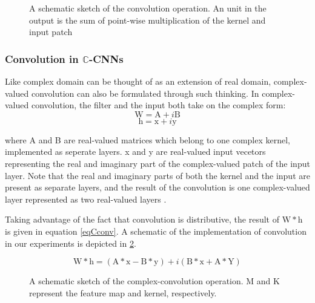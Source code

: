 \begin{figure}[htb]
	\centering
	\epsfxsize=6cm
	{}
	\caption{A schematic sketch of the convolution operation. An unit in the output is the sum of point-wise multiplication of the kernel and input patch \cite{bloggg}}
	\label{fig:conv}
\end{figure}
 

\subsubsection{Convolution in $\mathbb{C}$-CNNs}
Like complex domain can be thought of as an extension of real domain, complex-valued convolution can also be formulated through such thinking. In complex-valued convolution, the filter and the input both take on the complex form:
 \begin{equation}
\mathrm{W} = \mathrm{A}+i\mathrm{B}
\label{eqCfilter}
\end{equation}
 \begin{equation}
\mathrm{h} = \mathrm{x}+i\mathrm{y}
\label{eqCinput}
\end{equation}
 
where A and B are real-valued matrices which belong to one complex kernel, implemented as seperate layers. x and y are real-valued input vecetors  representing the real and imaginary part of the complex-valued patch of the input layer. Note that the real and imaginary parts of both the kernel and the input are present as separate layers, and the result of the convolution is one complex-valued layer represented as two real-valued layers \cite{Guberman}. 

Taking advantage of the fact that convolution is distributive, the result of $\mathrm{W*h}$ is given in equation \ref{eqCconv}. A schematic of the implementation of convolution in our experiments is depicted in \ref{fig:complexconv}.

 \begin{equation}
\mathrm{W*h} = (\mathrm{A*x-B*y})+i(\mathrm{B*x+A*Y})
\label{eqCconv}
\end{equation}

 \begin{figure}[htb]
	\centering
	\epsfxsize=10cm
	{}
	\caption{A schematic sketch of the complex-convolution operation. M and K represent the feature map and kernel, respectively.  \cite{trabelsi2018deep}}
	\label{fig:complexconv}
\end{figure}

